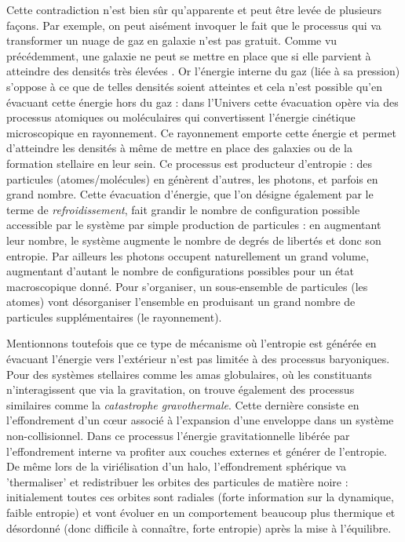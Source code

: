 Cette contradiction n'est bien sûr qu'apparente et peut être levée de plusieurs façons. Par exemple, on peut aisément invoquer le fait que le processus qui va transformer un nuage de gaz en galaxie n'est pas gratuit. Comme vu précédemment, une galaxie ne peut se mettre en place que si elle parvient à atteindre des densités très élevées . Or l'énergie interne du gaz (liée à sa pression) s'oppose à ce que de telles densités soient atteintes et cela n'est possible qu'en évacuant cette énergie hors du gaz : dans l'Univers cette évacuation opère via des processus atomiques ou moléculaires qui convertissent l'énergie cinétique microscopique en rayonnement. Ce rayonnement emporte cette énergie et permet d'atteindre les densités à même de mettre en place des galaxies ou de la formation stellaire en leur sein. Ce processus est producteur d'entropie : des particules (atomes/molécules) en génèrent d'autres, les photons, et parfois en grand nombre. Cette évacuation d'énergie, que l'on désigne également par le terme de \textit{refroidissement}, fait grandir le nombre de configuration possible accessible par le système par simple production de particules : en augmentant leur nombre, le système augmente le nombre de degrés de libertés et donc son entropie. Par ailleurs les photons occupent naturellement un grand volume, augmentant d'autant le nombre de configurations possibles pour un état macroscopique donné.  Pour s'organiser, un sous-ensemble de particules (les atomes) vont désorganiser l'ensemble en produisant un grand nombre de particules supplémentaires (le rayonnement).

Mentionnons toutefois que ce type de mécanisme où l'entropie est générée en évacuant l'énergie vers l'extérieur n'est pas limitée à des processus baryoniques. Pour des systèmes stellaires comme les amas globulaires, où les constituants n'interagissent que via la gravitation, on trouve également des processus similaires comme la \textit{catastrophe gravothermale}. Cette dernière consiste en l'effondrement d'un cœur associé à l'expansion d'une enveloppe dans un système non-collisionnel. Dans ce processus l'énergie gravitationnelle libérée par l'effondrement interne va profiter aux couches externes et générer de l'entropie. De même lors de la viriélisation d'un halo, l'effondrement sphérique va 'thermaliser' et redistribuer les orbites des particules de matière noire : initialement toutes ces orbites sont radiales (forte information sur la dynamique, faible entropie) et vont évoluer en un comportement beaucoup plus thermique et désordonné (donc difficile à connaître, forte entropie) après la mise à l'équilibre.

